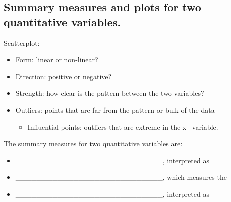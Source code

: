 \documentclass[
]{report}
\providecommand{\tightlist}{%
  \setlength{\itemsep}{0pt}\setlength{\parskip}{0pt}}
\begin{document}

\hypertarget{summary-measures-and-plots-for-two-quantitative-variables.}{%
\subsection{Summary measures and plots for two quantitative variables.}\label{summary-measures-and-plots-for-two-quantitative-variables.}}

Scatterplot:

\begin{itemize}
\item
  Form: linear or non-linear?
\item
  Direction: positive or negative?
\item
  Strength: how clear is the pattern between the two variables?
\item
  Outliers: points that are far from the pattern or bulk of the data

  \begin{itemize}
  \tightlist
  \item
    Influential points: outliers that are extreme in the x-~variable.
  \end{itemize}
\end{itemize}


The summary measures for two quantitative variables are:

\begin{itemize}
\tightlist
\item
  \_\_\_\_\_\_\_\_\_\_\_\_\_\_\_\_\_\_\_\_\_\_\_\_\_\_\_\_, interpreted as
\end{itemize}

\vspace{0.6in}

\begin{itemize}
\tightlist
\item
  \_\_\_\_\_\_\_\_\_\_\_\_\_\_\_\_\_\_\_\_\_\_\_\_\_\_\_\_, which measures the
\end{itemize}

\vspace{0.6in}

\begin{itemize}
\tightlist
\item
  \_\_\_\_\_\_\_\_\_\_\_\_\_\_\_\_\_\_\_\_\_\_\_\_\_\_\_\_, interpreted as
\end{itemize}

\vspace{0.6in}
\end{document}
